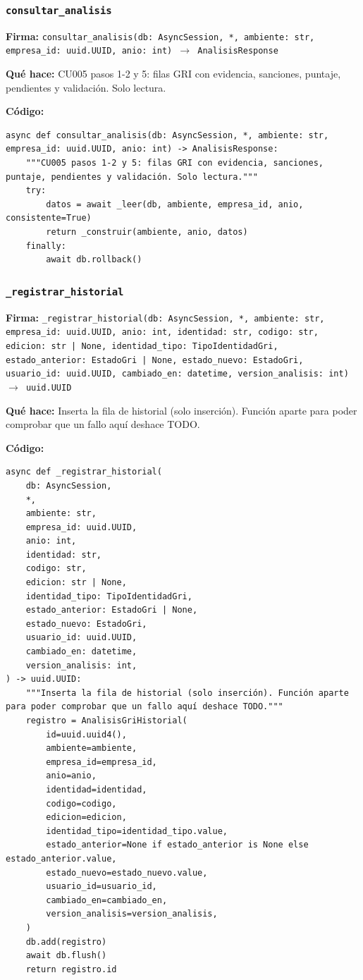\documentclass[11pt,a4paper]{article}
\begin{document}
\subsubsection*{\texttt{consultar\_analisis}}
\textbf{Firma:} \texttt{consultar\_analisis(db: AsyncSession, *, ambiente: str, empresa\_id: uuid.UUID, anio: int) $\rightarrow$ AnalisisResponse}

\textbf{Qué hace:} CU005 pasos 1-2 y 5: filas GRI con evidencia, sanciones, puntaje, pendientes y validación. Solo lectura.

\textbf{Código:}
\begin{lstlisting}
async def consultar_analisis(db: AsyncSession, *, ambiente: str, empresa_id: uuid.UUID, anio: int) -> AnalisisResponse:
    """CU005 pasos 1-2 y 5: filas GRI con evidencia, sanciones, puntaje, pendientes y validación. Solo lectura."""
    try:
        datos = await _leer(db, ambiente, empresa_id, anio, consistente=True)
        return _construir(ambiente, anio, datos)
    finally:
        await db.rollback()
\end{lstlisting}

\subsubsection*{\texttt{\_registrar\_historial}}
\textbf{Firma:} \texttt{\_registrar\_historial(db: AsyncSession, *, ambiente: str, empresa\_id: uuid.UUID, anio: int, identidad: str, codigo: str, edicion: str | None, identidad\_tipo: TipoIdentidadGri, estado\_anterior: EstadoGri | None, estado\_nuevo: EstadoGri, usuario\_id: uuid.UUID, cambiado\_en: datetime, version\_analisis: int) $\rightarrow$ uuid.UUID}

\textbf{Qué hace:} Inserta la fila de historial (solo inserción). Función aparte para poder comprobar que un fallo aquí deshace TODO.

\textbf{Código:}
\begin{lstlisting}
async def _registrar_historial(
    db: AsyncSession,
    *,
    ambiente: str,
    empresa_id: uuid.UUID,
    anio: int,
    identidad: str,
    codigo: str,
    edicion: str | None,
    identidad_tipo: TipoIdentidadGri,
    estado_anterior: EstadoGri | None,
    estado_nuevo: EstadoGri,
    usuario_id: uuid.UUID,
    cambiado_en: datetime,
    version_analisis: int,
) -> uuid.UUID:
    """Inserta la fila de historial (solo inserción). Función aparte para poder comprobar que un fallo aquí deshace TODO."""
    registro = AnalisisGriHistorial(
        id=uuid.uuid4(),
        ambiente=ambiente,
        empresa_id=empresa_id,
        anio=anio,
        identidad=identidad,
        codigo=codigo,
        edicion=edicion,
        identidad_tipo=identidad_tipo.value,
        estado_anterior=None if estado_anterior is None else estado_anterior.value,
        estado_nuevo=estado_nuevo.value,
        usuario_id=usuario_id,
        cambiado_en=cambiado_en,
        version_analisis=version_analisis,
    )
    db.add(registro)
    await db.flush()
    return registro.id
\end{lstlisting}
\end{document}
